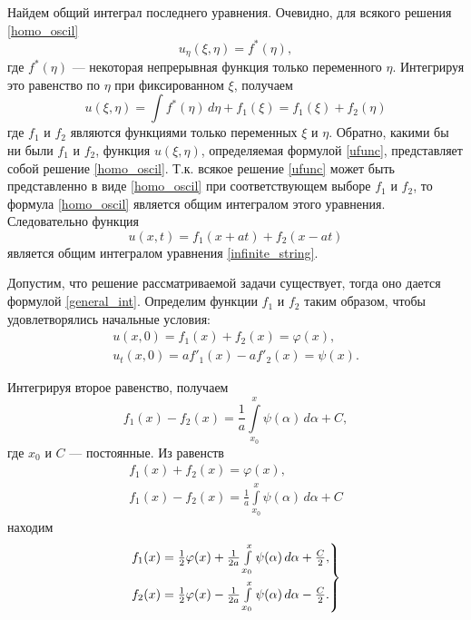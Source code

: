 Найдем общий интеграл последнего уравнения. Очевидно, для всякого решения \eqref{homo_oscil}
\begin{equation*}
	u_{\eta}(\xi, \eta) = f^{\ast}(\eta),
\end{equation*}
где $f^{\ast}(\eta)$ --- некоторая непрерывная функция только переменного $\eta$. 
Интегрируя это равенство по $\eta$ при фиксированном $\xi$, получаем
\begin{equation} \label{ufunc}
	u(\xi, \eta) = \int f^{\ast}(\eta) \, d \eta + f_1(\xi) = f_1(\xi) + f_2(\eta)
\end{equation}
где $f_1$ и $f_2$ являются функциями только переменных $\xi$ и $\eta$. Обратно, какими бы ни были $f_1$ и $f_2$, функция $u(\xi, \eta)$, определяемая формулой \eqref{ufunc}, представляет собой решение \eqref{homo_oscil}. Т.к. всякое решение \eqref{ufunc} может быть представленно в виде \eqref{homo_oscil} при соответствующем выборе $f_1$ и $f_2$, то формула \eqref{homo_oscil} является общим интегралом этого уравнения. Следовательно функция
\begin{equation} \label{general_int}
	u(x, t) = f_1(x + a t) + f_2(x - a t)
\end{equation}
является общим интегралом уравнения \eqref{infinite_string}.

Допустим, что решение рассматриваемой задачи существует, тогда оно дается формулой \eqref{general_int}. Определим функции $f_1$ и $f_2$ таким образом, чтобы удовлетворялись начальные условия:
\begin{align}
	u(x, 0) = f_1(x) + f_2(x) = \varphi(x), \\
	u_t(x, 0) = a f'_1(x) - a f'_2(x) = \psi(x).
\end{align}

Интегрируя второе равенство, получаем 
\begin{equation*}
	f_1(x) - f_2(x) = \frac{1}{a} \int \limits_{x_0}^{x} \psi(\alpha) \, d\alpha + C,
\end{equation*}
где $x_0$ и $C$ --- постоянные. Из равенств 
\begin{align*}
	f_1(x) + f_2(x) = \varphi(x), \\
	f_1(x) - f_2(x) = \frac{1}{a} \int \limits_{x_0}^{x} \psi(\alpha) \, d\alpha + C
\end{align*}
находим
\begin{equation} \label{f1f2}
	\begin{rcases}
		f_1(x) = \frac{1}{2} \varphi(x) + \frac{1}{2a} \int \limits_{x_0}^{x} \psi(\alpha) \, d\alpha + \frac{C}{2}, \\
		f_2(x) = \frac{1}{2} \varphi(x) - \frac{1}{2a} \int \limits_{x_0}^{x} \psi(\alpha) \, d\alpha - \frac{C}{2}.
	\end{rcases}
\end{equation}

